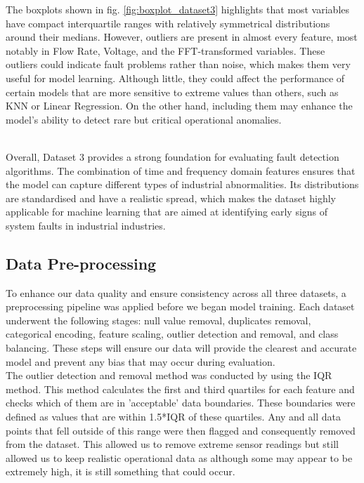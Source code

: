 \documentclass[11pt]{article}
\begin{document}
The boxplots shown in fig. \ref{fig:boxplot_dataset3} highlights that most variables have compact interquartile ranges with relatively symmetrical distributions around their medians. However, outliers are present in almost every feature, most notably in Flow Rate, Voltage, and the FFT-transformed variables. These outliers could indicate fault problems rather than noise, which makes them very useful for model learning. Although little, they could affect the performance of certain models that are more sensitive to extreme values than others, such as KNN or Linear Regression. On the other hand, including them may enhance the model’s ability to detect rare but critical operational anomalies.\\\

Overall, Dataset 3 provides a strong foundation for evaluating fault detection algorithms. The combination of time and frequency domain features ensures that the model can capture different types of industrial abnormalities. Its distributions are standardised and have a realistic spread, which makes the dataset highly applicable for machine learning that are aimed at identifying early signs of system faults in industrial industries.


\subsection{Data Pre-processing}

To enhance our data quality and ensure consistency across all three datasets, a preprocessing pipeline was applied before we began model training. Each dataset underwent the following stages: null value removal, duplicates removal, categorical encoding, feature scaling, outlier detection and removal, and class balancing. These steps will ensure our data will provide the clearest and accurate model and prevent any bias that may occur during evaluation.\\

The outlier detection and removal method was conducted by using the IQR method. This method calculates the first and third quartiles for each feature and checks which of them are in 'acceptable' data boundaries. These boundaries were defined as values that are within 1.5*IQR of these quartiles. Any and all data points that fell outside of this range were then flagged and consequently removed from the dataset. This allowed us to remove extreme sensor readings but still allowed us to keep realistic operational data as although some may appear to be extremely high, it is still something that could occur.\\
\end{document}
